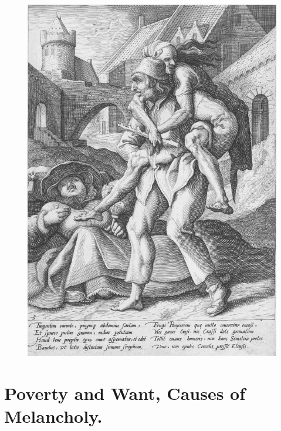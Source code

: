 {\cleartoleftpage{}
\begin{figure}[p]
  \begingroup
  \centering
  \includegraphics[keepaspectratio,width=\textwidth]{figures/carrying-povery-small.jpg}
  \label{fig:povertyriches}
\end{figure}

\clearpage{}
\thispagestyle{titleontop}
\section{Poverty and Want, Causes of Melancholy.}\label{sec:poverty-and-want}

}
